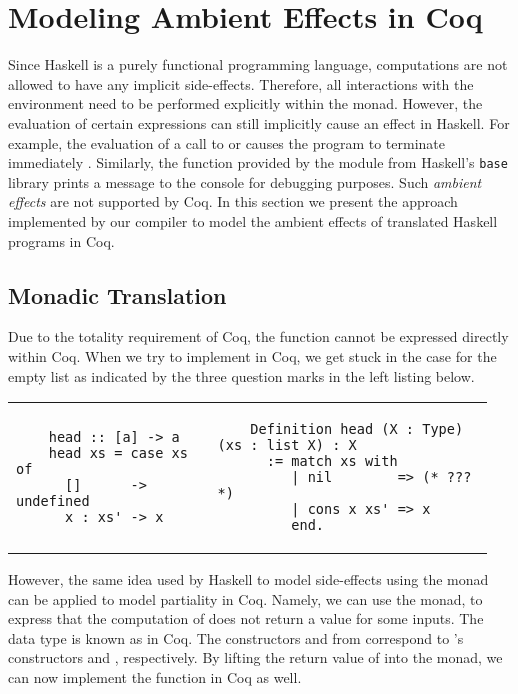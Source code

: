 \section{Modeling Ambient Effects in Coq} \label{sec:preliminaries:modeling-effects}
Since Haskell is a purely functional programming language, computations are not allowed to have any implicit side-effects.
Therefore, all interactions with the environment need to be performed explicitly within the  monad.
However, the evaluation of certain expressions can still implicitly cause an effect in Haskell.
For example, the evaluation of a call to  or  causes the program to terminate immediately \cite[p.~16]{Marlow:2010}.
Similarly, the  function provided by the  module from Haskell's \texttt{base} library prints a message to the console for debugging purposes.
Such \textit{ambient effects} \citep{Christiansen:2019} are not supported by Coq.
In this section we present the approach implemented by our compiler to model the ambient effects of translated Haskell programs in Coq.

\subsection{Monadic Translation} \label{sec:preliminaries:modeling-effects:monadic-translation}
Due to the totality requirement of Coq, the function  cannot be expressed directly within Coq.
When we try to implement  in Coq, we get stuck in the case for the empty list as indicated by the three question marks in the left listing below.

\begin{tabular}{p{0.40\linewidth} | p{0.55\linewidth}}
  \begin{verbatim}
    head :: [a] -> a
    head xs = case xs of
      []      -> undefined
      x : xs' -> x
  \end{verbatim}
  &
  \begin{verbatim}
    Definition head (X : Type) (xs : list X) : X
      := match xs with
         | nil        => (* ??? *)
         | cons x xs' => x
         end.
  \end{verbatim}
\end{tabular}

However, the same idea used by Haskell to model side-effects using the  monad can be applied to model partiality in Coq.
Namely, we can use the  monad, to express that the computation of  does not return a value for some inputs.
The  data type is known as  in Coq.
The constructors  and  from  correspond to 's constructors  and , respectively.
By lifting the return value of  into the  monad, we can now implement the function in Coq as well.

